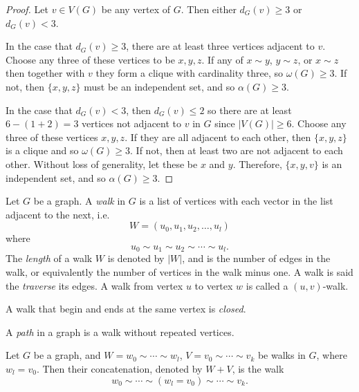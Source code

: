 \documentclass[12pt]{article}
\begin{document}
\begin{proof}
    Let $v \in V(G)$ be any vertex of $G$. Then either $d_G(v) \geq 3$ or $d_G(v) < 3$.

    In the case that $d_G(v) \geq 3$, there are at least three vertices adjacent to $v$. Choose any three of these vertices to be $x, y, z$. If any of $x \sim y$, $y \sim z$, or $x \sim z$ then together with $v$ they form a clique with cardinality three, so $\omega(G) \geq 3$. If not, then $\{x, y, z\}$ must be an independent set, and so $\alpha(G) \geq 3$.

    In the case that $d_G(v) < 3$, then $d_G(v) \leq 2$ so there are at least $6 - (1 + 2) = 3$ vertices not adjacent to $v$ in $G$ since $|V(G)| \geq 6$. Choose any three of these vertices $x, y, z$. If they are all adjacent to each other, then $\{x, y, z\}$ is a clique and so $\omega(G) \geq 3$. If not, then at least two are not adjacent to each other. Without loss of generality, let these be $x$ and $y$. Therefore, $\{x, y, v\}$ is an independent set, and so $\alpha(G) \geq 3$.
\end{proof}

\begin{defn}
    Let $G$ be a graph. A \emph{walk} in $G$ is a list of vertices with each vector in the list adjacent to the next, i.e. \[W = (u_0, u_1, u_2, \ldots, u_l)\] where \[u_0 \sim u_1 \sim u_2 \sim \cdots \sim u_l.\] The \emph{length} of a walk $W$ is denoted by $|W|$, and is the number of edges in the walk, or equivalently the number of vertices in the walk minus one. A walk is said the \emph{traverse} its edges. A walk from vertex $u$ to vertex $w$ is called a $(u, v)$-walk.
\end{defn}

\begin{defn}
    A walk that begin and ends at the same vertex is \emph{closed}.
\end{defn}

\begin{defn}
    A \emph{path} in a graph is a walk without repeated vertices.
\end{defn}

\begin{defn}
    Let $G$ be a graph, and $W = w_0 \sim \cdots \sim w_l$, $V = v_0 \sim \cdots \sim v_k$ be walks in $G$, where $w_l = v_0$. Then their concatenation, denoted by $W + V$, is the walk \[w_0 \sim \cdots \sim (w_l = v_0) \sim \cdots \sim v_k.\]
\end{defn}
\end{document}
